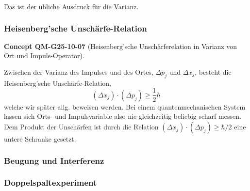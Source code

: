 \documentclass[10pt, letterpaper]{article}
\newcommand{\CustomHeading}[3]{%
  \par\medskip\noindent%
  \textbf{#1 #2} \textnormal{(#3)}.\enskip%
}
\newenvironment{CONC}[2]{\begin{unitbox}\CustomHeading{Concept}{#1}{#2}}{\end{unitbox}}
\begin{document}
Das ist der übliche Ausdruck für die Varianz.

\subsubsection*{Heisenberg'sche Unschärfe-Relation}


\begin{CONC}{QM-G25-10-07}{Heisenberg'sche Unschärferelation in Varianz von Ort und Impuls-Operator}
Zwischen der Varianz des Impulses und des Ortes, $\Delta p_{j}$ und $\Delta x_{j}$, besteht die Heisenberg'sche Unschärfe-Relation,
$$
\left(\Delta x_{j}\right) \cdot\left(\Delta p_{j}\right) \geq \frac{1}{2} \hbar
$$
welche wir später allg. beweisen werden. Bei einem quantenmechanischen System lassen sich Orts- und Impulsvariable also nie gleichzeitig beliebig scharf messen. Dem Produkt der Unschärfen ist durch die Relation $\left(\Delta x_{j}\right) \cdot\left(\Delta p_{j}\right) \geq \hbar / 2$ eine untere Schranke gesetzt.
\end{CONC}



\subsubsection{Beugung und Interferenz}


\subsubsection*{Doppelspaltexperiment}
\end{document}
